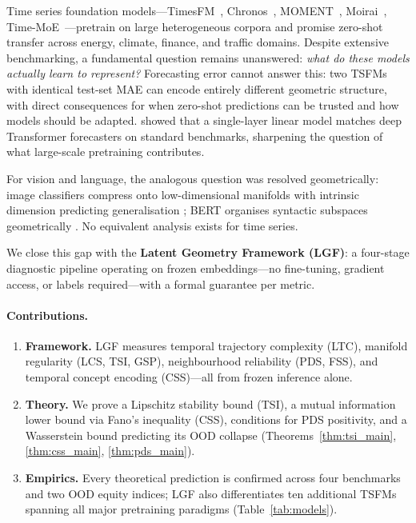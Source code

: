 \documentclass[10pt]{article}
\theoremstyle{definition}
\theoremstyle{remark}
\begin{document}
Time series foundation models---TimesFM~\citep{das2024timesfm},
Chronos~\citep{ansari2024chronos}, MOMENT~\citep{goswami2024moment},
Moirai~\citep{woo2024moirai}, Time-MoE~\citep{shi2024timemoe}---pretrain
on large heterogeneous corpora and promise zero-shot transfer across energy,
climate, finance, and traffic domains.
Despite extensive benchmarking, a fundamental question remains unanswered:
\emph{what do these models actually learn to represent?}
Forecasting error cannot answer this: two TSFMs with identical test-set MAE
can encode entirely different geometric structure, with direct consequences
for when zero-shot predictions can be trusted and how models should be adapted.
\citet{zeng2023transformers} showed that a single-layer linear model matches
deep Transformer forecasters on standard benchmarks, sharpening the question
of what large-scale pretraining contributes.

For vision and language, the analogous question was resolved geometrically:
image classifiers compress onto low-dimensional manifolds with intrinsic
dimension predicting generalisation \citep{ansuini2019intrinsic};
BERT organises syntactic subspaces geometrically \citep{reif2019visualizing}.
No equivalent analysis exists for time series.

We close this gap with the \textbf{Latent Geometry Framework (LGF)}: a
four-stage diagnostic pipeline operating on frozen embeddings---no fine-tuning,
gradient access, or labels required---with a formal guarantee per metric.

\paragraph{Contributions.}
\begin{enumerate}
  \setlength{\itemsep}{2pt}\setlength{\topsep}{2pt}
  \item \textbf{Framework.} LGF measures temporal trajectory complexity (LTC),
    manifold regularity (LCS, TSI, GSP), neighbourhood reliability (PDS, FSS),
    and temporal concept encoding (CSS)---all from frozen inference alone.
  \item \textbf{Theory.} We prove a Lipschitz stability bound (TSI), a mutual
    information lower bound via Fano's inequality (CSS), conditions for PDS
    positivity, and a Wasserstein bound predicting its OOD collapse
    (Theorems~\ref{thm:tsi_main}, \ref{thm:css_main}, \ref{thm:pds_main}).
  \item \textbf{Empirics.} Every theoretical prediction is confirmed across
    four benchmarks and two OOD equity indices; LGF also differentiates ten
    additional TSFMs spanning all major pretraining paradigms
    (Table~\ref{tab:models}).
\end{enumerate}
\end{document}
